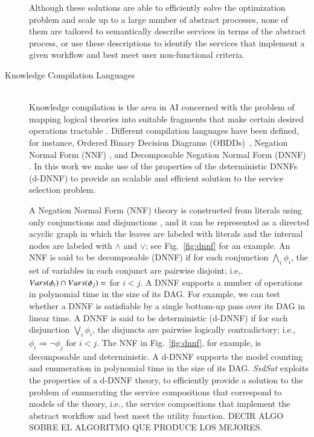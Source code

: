 \documentclass{llncs}
\begin{document}
\begin{description}
Although these solutions are able to efficiently solve the optimization problem and scale up to a large number of abstract processes, none of them are tailored to semantically describe services in terms of the abstract process, or use these descriptions to identify the services that  implement a given workflow and best meet user non-functional criteria.

  
\item[Knowledge Compilation Languages] \mbox{}\\
Knowledge compilation is the area in AI concerned with the
problem of mapping logical theories into suitable fragments
that make certain desired operations tractable
\cite{cadoli:compilation}. Different compilation languages have been defined, for instance,  
Ordered Binary Decision Diagrams (OBDDs)~\cite{bryant:obdd},  Negation Normal Form (NNF) \cite{barwise:handbook}, and Decomposable Negation Normal Form (DNNF)  \cite{darwiche:dnnf}.
In this work we make use of the properties of the deterministic DNNFs  (d-DNNF) \cite{darwiche:d-dnnfs} to provide an scalable and efficient solution to the service selection problem. 

A Negation Normal Form (NNF) theory is  constructed from literals using only conjunctions
and disjunctions \cite{barwise:handbook}, and it can be represented as a directed acyclic graph
in which the leaves are labeled with literals and the
internal nodes are labeled with $\land$ and $\lor$;
see Fig.~\ref{fig:dnnf} for an example. An NNF is said to be decomposable (DNNF) \cite{darwiche:dnnf}
if for each conjunction $\bigwedge_i\phi_i$, the set of
variables in each conjunct are pairwise disjoint;
i.e,. $Vars(\phi_i)\cap Vars(\phi_j)=\empty$ for $i<j$.
A DNNF supports a number of operations in
polynomial time in the size of its DAG. For example,
we can test whether a DNNF is satisfiable by a single
bottom-up pass over its DAG in linear time. A DNNF is said to be deterministic (d-DNNF) \cite{darwiche:d-dnnfs} if for each disjunction $\bigvee_i\phi_i$, the disjuncts
are pairwise logically contradictory; i.e.,
$\phi_i\Rightarrow\neg\phi_j$ for $i<j$.
The NNF in Fig.~\ref{fig:dnnf}, for example, is decomposable
and deterministic. A d-DNNF supports the model counting and enumeration in polynomial time
in the size of its DAG.  {\it SsdSat}  exploits the properties of a d-DNNF theory, to efficiently provide a solution to the problem of enumerating the service compositions that correspond to models of the  theory, i.e., the service compositions that implement the abstract  workflow and best meet the utility function. DECIR ALGO SOBRE EL ALGORITMO QUE PRODUCE LOS MEJORES.




\end{description}
\end{document}
